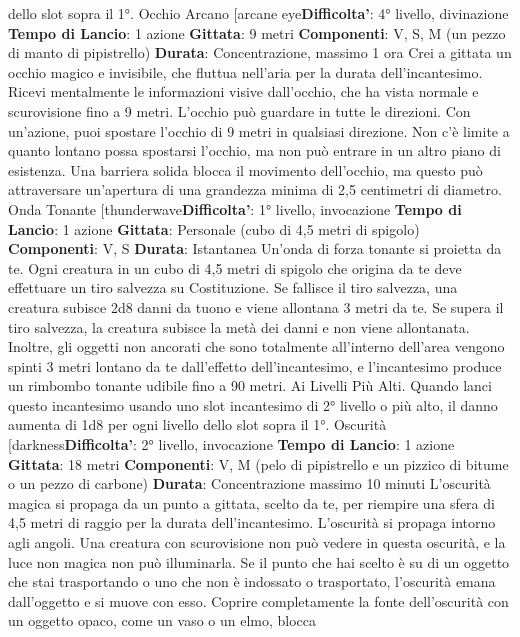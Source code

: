 \begin{multicols}{2}
dello slot sopra il 1°.
Occhio Arcano
[arcane eye\textbf{Difficolta'}:
4° livello, divinazione
\textbf{Tempo di Lancio}: 1 azione
\textbf{Gittata}: 9 metri
\textbf{Componenti}: V, S, M (un pezzo di manto di pipistrello)
\textbf{Durata}: Concentrazione, massimo 1 ora
Crei a gittata un occhio magico e invisibile, che fluttua
nell’aria per la durata dell’incantesimo.
Ricevi mentalmente le informazioni visive dall’occhio,
che ha vista normale e scurovisione fino a 9 metri.
L’occhio può guardare in tutte le direzioni.
Con un’azione, puoi spostare l’occhio di 9 metri in
qualsiasi direzione. Non c’è limite a quanto lontano
possa spostarsi l’occhio, ma non può entrare in un altro
piano di esistenza. Una barriera solida blocca il
movimento dell’occhio, ma questo può attraversare
un’apertura di una grandezza minima di 2,5 centimetri
di diametro.
Onda Tonante
[thunderwave\textbf{Difficolta'}:
1° livello, invocazione
\textbf{Tempo di Lancio}: 1 azione
\textbf{Gittata}: Personale (cubo di 4,5 metri di spigolo)
\textbf{Componenti}: V, S
\textbf{Durata}: Istantanea
Un’onda di forza tonante si proietta da te. Ogni creatura
in un cubo di 4,5 metri di spigolo che origina da te deve
effettuare un tiro salvezza su Costituzione. Se fallisce il
tiro salvezza, una creatura subisce 2d8 danni da tuono
e viene allontana 3 metri da te. Se supera il tiro
salvezza, la creatura subisce la metà dei danni e non
viene allontanata.
Inoltre, gli oggetti non ancorati che sono totalmente
all’interno dell’area vengono spinti 3 metri lontano da te
dall’effetto dell’incantesimo, e l’incantesimo produce un
rimbombo tonante udibile fino a 90 metri.
Ai Livelli Più Alti. Quando lanci questo incantesimo
usando uno slot incantesimo di 2° livello o più alto, il
danno aumenta di 1d8 per ogni livello dello slot sopra il
1°.
Oscurità
[darkness\textbf{Difficolta'}:
2° livello, invocazione
\textbf{Tempo di Lancio}: 1 azione
\textbf{Gittata}: 18 metri
\textbf{Componenti}: V, M (pelo di pipistrello e un pizzico di
bitume o un pezzo di carbone)
\textbf{Durata}: Concentrazione massimo 10 minuti
L’oscurità magica si propaga da un punto a gittata,
scelto da te, per riempire una sfera di 4,5 metri di raggio
per la durata dell’incantesimo. L’oscurità si propaga
intorno agli angoli. Una creatura con scurovisione non
può vedere in questa oscurità, e la luce non magica non
può illuminarla.
Se il punto che hai scelto è su di un oggetto che stai
trasportando o uno che non è indossato o trasportato,
l’oscurità emana dall’oggetto e si muove con esso.
Coprire completamente la fonte dell’oscurità con un
oggetto opaco, come un vaso o un elmo, blocca

\end{multicols}
